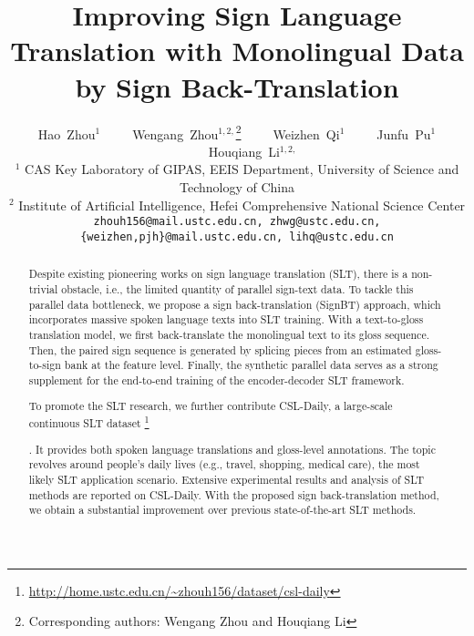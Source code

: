 \documentclass[final]{cvpr}
\newcommand\blfootnote[1]{\begingroup 
\renewcommand\thefootnote{}\footnote{#1}\addtocounter{footnote}{-1}\endgroup 
}
\begin{document}
\title{Improving Sign Language Translation with Monolingual Data\\by Sign Back-Translation}

\author{Hao~Zhou$^{1}$~~~~~Wengang~Zhou$^{1,2,}$\thanks{Corresponding authors: Wengang Zhou and Houqiang Li}~~~~~Weizhen~Qi$^{1}$~~~~~Junfu~Pu$^{1}$~~~~~Houqiang~Li$^{1,2,}$\footnotemark[1]\\
{\normalsize$^{1}$ CAS Key Laboratory of GIPAS, EEIS Department, University of Science and Technology of China}\\
{\normalsize$^{2}$ Institute of Artificial Intelligence, Hefei Comprehensive National Science Center}\\
{\tt\small zhouh156@mail.ustc.edu.cn, zhwg@ustc.edu.cn, \{weizhen,pjh\}@mail.ustc.edu.cn, lihq@ustc.edu.cn}
}

\maketitle
\thispagestyle{empty}
\pagestyle{empty}

\begin{abstract}
Despite existing pioneering works on sign language translation (SLT), there is a non-trivial obstacle, i.e., the limited quantity of parallel sign-text data. 
To tackle this parallel data bottleneck, we propose a sign back-translation (SignBT) approach, which incorporates massive spoken language texts into SLT training. 
With a text-to-gloss translation model, we first back-translate the monolingual text to its gloss sequence. 
Then, the paired sign sequence is generated by splicing pieces from an estimated gloss-to-sign bank at the feature level. 
Finally, the synthetic parallel data serves as a strong supplement for the end-to-end training of the encoder-decoder SLT framework. 

To promote the SLT research, we further contribute CSL-Daily, a large-scale continuous SLT dataset\blfootnote{\scriptsize{\url{http://home.ustc.edu.cn/~zhouh156/dataset/csl-daily}}}. 
It provides both spoken language translations and gloss-level annotations. 
The topic revolves around people's daily lives (e.g., travel, shopping, medical care), the most likely SLT application scenario.
Extensive experimental results and analysis of SLT methods are reported on CSL-Daily. 
With the proposed sign back-translation method, we obtain a substantial improvement over previous state-of-the-art SLT methods. 

\vspace{-4pt}
\end{abstract}
\end{document}
